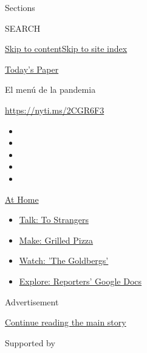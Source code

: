 Sections

SEARCH

\protect\hyperlink{site-content}{Skip to
content}\protect\hyperlink{site-index}{Skip to site index}

\href{https://myaccount.nytimes3xbfgragh.onion/auth/login?response_type=cookie\&client_id=vi}{}

\href{https://www.nytimes3xbfgragh.onion/section/todayspaper}{Today's
Paper}

El menú de la pandemia

\url{https://nyti.ms/2CGR6F3}

\begin{itemize}
\item
\item
\item
\item
\item
\end{itemize}

\href{https://www.nytimes3xbfgragh.onion/spotlight/at-home?action=click\&pgtype=Article\&state=default\&region=TOP_BANNER\&context=at_home_menu}{At
Home}

\begin{itemize}
\tightlist
\item
  \href{https://www.nytimes3xbfgragh.onion/2020/08/03/well/family/the-benefits-of-talking-to-strangers.html?action=click\&pgtype=Article\&state=default\&region=TOP_BANNER\&context=at_home_menu}{Talk:
  To Strangers}
\item
  \href{https://www.nytimes3xbfgragh.onion/2020/08/01/at-home/coronavirus-make-pizza-on-a-grill.html?action=click\&pgtype=Article\&state=default\&region=TOP_BANNER\&context=at_home_menu}{Make:
  Grilled Pizza}
\item
  \href{https://www.nytimes3xbfgragh.onion/2020/07/31/arts/television/goldbergs-abc-stream.html?action=click\&pgtype=Article\&state=default\&region=TOP_BANNER\&context=at_home_menu}{Watch:
  'The Goldbergs'}
\item
  \href{https://www.nytimes3xbfgragh.onion/interactive/2020/at-home/even-more-reporters-editors-diaries-lists-recommendations.html?action=click\&pgtype=Article\&state=default\&region=TOP_BANNER\&context=at_home_menu}{Explore:
  Reporters' Google Docs}
\end{itemize}

Advertisement

\protect\hyperlink{after-top}{Continue reading the main story}

Supported by

